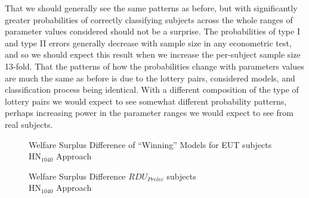 \documentclass[../main.tex]{subfiles}
\begin{document}
That we should generally see the same patterns as before, but with significantly greater probabilities of correctly classifying subjects across the whole ranges of parameter values considered should not be a surprise.
The probabilities of type I and type II errors generally decrease with sample size in any econometric test, and so we should expect this result when we increase the per-subject sample size 13-fold.
That the patterns of how the probabilities change with parameters values are much the same as before is due to the lottery pairs, considered models, and classification process being identical.
With a different composition of the type of lottery pairs we would expect to see somewhat different probability patterns, perhaps increasing power in the parameter ranges we would expect to see from real subjects.

\begin{figure}[h!]
	\center
	\caption{Welfare Surplus Difference of \enquote{Winning} Models for EUT subjects\\$\text{HN}_{1040}$ Approach}
	\label{fig:HN_wel_eut}
\end{figure}

\begin{figure}[h!]
	\center
	\caption{Welfare Surplus Difference $\mathit{RDU_{Prelec}}$ subjects\\$\text{HN}_{1040}$ Approach}
	\label{fig:HN_wel_pre}
\end{figure}
\end{document}
